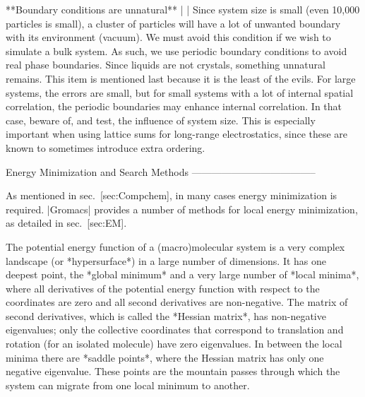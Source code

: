 **Boundary conditions are unnatural**
    | 
    | Since system size is small (even 10,000 particles is small), a
      cluster of particles will have a lot of unwanted boundary with its
      environment (vacuum). We must avoid this condition if we wish to
      simulate a bulk system. As such, we use periodic boundary
      conditions to avoid real phase boundaries. Since liquids are not
      crystals, something unnatural remains. This item is mentioned last
      because it is the least of the evils. For large systems, the
      errors are small, but for small systems with a lot of internal
      spatial correlation, the periodic boundaries may enhance internal
      correlation. In that case, beware of, and test, the influence of
      system size. This is especially important when using lattice sums
      for long-range electrostatics, since these are known to sometimes
      introduce extra ordering.

Energy Minimization and Search Methods
--------------------------------------

As mentioned in sec. [sec:Compchem], in many cases energy minimization
is required. |Gromacs| provides a number of methods for local energy
minimization, as detailed in sec. [sec:EM].

The potential energy function of a (macro)molecular system is a very
complex landscape (or *hypersurface*) in a large number of dimensions.
It has one deepest point, the *global minimum* and a very large number
of *local minima*, where all derivatives of the potential energy
function with respect to the coordinates are zero and all second
derivatives are non-negative. The matrix of second derivatives, which is
called the *Hessian matrix*, has non-negative eigenvalues; only the
collective coordinates that correspond to translation and rotation (for
an isolated molecule) have zero eigenvalues. In between the local minima
there are *saddle points*, where the Hessian matrix has only one
negative eigenvalue. These points are the mountain passes through which
the system can migrate from one local minimum to another.

